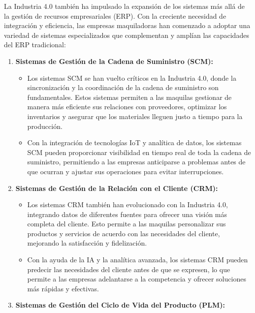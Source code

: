 \documentclass[
  letterpaper,
]{book}
\providecommand{\tightlist}{%
  \setlength{\itemsep}{0pt}\setlength{\parskip}{0pt}}\usepackage{longtable,booktabs,array}
\begin{document}
La Industria 4.0 también ha impulsado la expansión de los sistemas más
allá de la gestión de recursos empresariales (ERP). Con la creciente
necesidad de integración y eficiencia, las empresas maquiladoras han
comenzado a adoptar una variedad de sistemas especializados que
complementan y amplían las capacidades del ERP tradicional:

\begin{enumerate}
\def\labelenumi{\arabic{enumi}.}
\tightlist
\item
  \textbf{Sistemas de Gestión de la Cadena de Suministro (SCM):}

  \begin{itemize}
  \tightlist
  \item
    Los sistemas SCM se han vuelto críticos en la Industria 4.0, donde
    la sincronización y la coordinación de la cadena de suministro son
    fundamentales. Estos sistemas permiten a las maquilas gestionar de
    manera más eficiente sus relaciones con proveedores, optimizar los
    inventarios y asegurar que los materiales lleguen justo a tiempo
    para la producción.
  \item
    Con la integración de tecnologías IoT y analítica de datos, los
    sistemas SCM pueden proporcionar visibilidad en tiempo real de toda
    la cadena de suministro, permitiendo a las empresas anticiparse a
    problemas antes de que ocurran y ajustar sus operaciones para evitar
    interrupciones.
  \end{itemize}
\item
  \textbf{Sistemas de Gestión de la Relación con el Cliente (CRM):}

  \begin{itemize}
  \tightlist
  \item
    Los sistemas CRM también han evolucionado con la Industria 4.0,
    integrando datos de diferentes fuentes para ofrecer una visión más
    completa del cliente. Esto permite a las maquilas personalizar sus
    productos y servicios de acuerdo con las necesidades del cliente,
    mejorando la satisfacción y fidelización.
  \item
    Con la ayuda de la IA y la analítica avanzada, los sistemas CRM
    pueden predecir las necesidades del cliente antes de que se
    expresen, lo que permite a las empresas adelantarse a la competencia
    y ofrecer soluciones más rápidas y efectivas.
  \end{itemize}
\item
  \textbf{Sistemas de Gestión del Ciclo de Vida del Producto (PLM):}


\end{enumerate}
\end{document}
